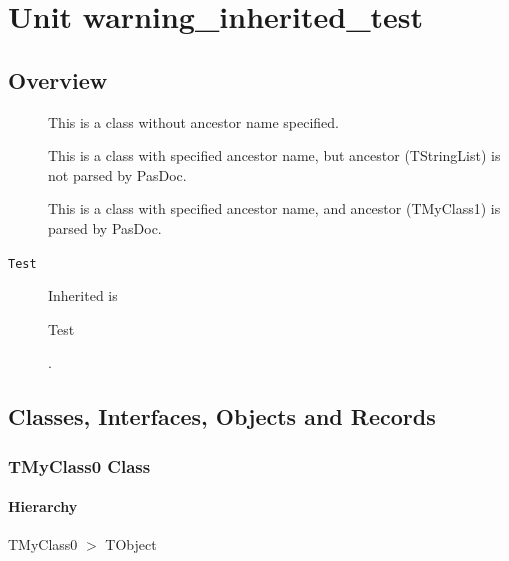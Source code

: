 \documentclass{report}
\newif\ifpdf
\begin{document}
\label{toc}\tableofcontents
\newpage
\newlength{\tmplength}
\chapter{Unit warning{\_}inherited{\_}test}
\label{warning_inherited_test}
\section{Overview}
\begin{description}
\item[\texttt{\begin{ttfamily}TMyClass0\end{ttfamily} Class}]This is a class without ancestor name specified.
\item[\texttt{\begin{ttfamily}TMyClass1\end{ttfamily} Class}]This is a class with specified ancestor name, but ancestor (TStringList) is not parsed by PasDoc.
\item[\texttt{\begin{ttfamily}TMyClass2\end{ttfamily} Class}]This is a class with specified ancestor name, and ancestor (TMyClass1) is parsed by PasDoc.
\end{description}
\begin{description}
\item[\texttt{Test}]Inherited is \begin{ttfamily}Test\end{ttfamily}.
\end{description}
\section{Classes, Interfaces, Objects and Records}
\ifpdf
\subsection*{\large{\textbf{TMyClass0 Class}}\normalsize\hspace{1ex}\hrulefill}
\else
\subsection*{TMyClass0 Class}
\fi
\label{warning_inherited_test.TMyClass0}
\subsubsection*{\large{\textbf{Hierarchy}}\normalsize\hspace{1ex}\hfill}
TMyClass0 {$>$} TObject
\end{document}
